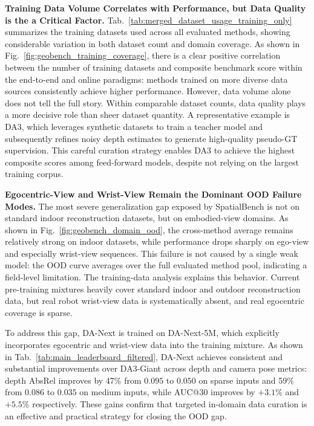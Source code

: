 \documentclass{llmxive}
\providecommand{\benchmark}{SpatialBench\xspace}
\providecommand{\dataset}{DA-Next-5M\xspace}
\providecommand{\ours}{DA-Next\xspace}
\begin{document}
\noindent\textbf{Training Data Volume Correlates with Performance, but Data Quality is the a Critical Factor.}
Tab.~\ref{tab:merged_dataset_usage_training_only} summarizes the training datasets used across all evaluated methods, showing considerable variation in both dataset count and domain coverage.
%
As shown in Fig.~\ref{fig:geobench_training_coverage}, there is a clear positive correlation between the number of training datasets and composite benchmark score within the end-to-end and online paradigms: methods trained on more diverse data sources consistently achieve higher performance.
%
However, data volume alone does not tell the full story.
%
Within comparable dataset counts, data quality plays a more decisive role than sheer dataset quantity.
%
A representative example is DA3, which leverages synthetic datasets to train a teacher model and subsequently refines noisy depth estimates to generate high-quality pseudo-GT supervision. 
%
This careful curation strategy enables DA3 to achieve the highest composite scores among feed-forward models, despite not relying on the largest training corpus.
%

\noindent\textbf{Egocentric-View and Wrist-View Remain the Dominant OOD Failure Modes.}
The most severe generalization gap exposed by \benchmark is not on standard indoor reconstruction datasets, but on embodied-view domains.
%
As shown in Fig.~\ref{fig:geobench_domain_ood}, the cross-method average remains relatively strong on indoor datasets, while performance drops sharply on ego-view and especially wrist-view sequences.
%
This failure is not caused by a single weak model: the OOD curve averages over the full evaluated method pool, indicating a field-level limitation.
%
The training-data analysis explains this behavior.
%
Current pre-training mixtures heavily cover standard indoor and outdoor reconstruction data, but real robot wrist-view data is systematically absent, and real egocentric coverage is sparse.

To address this gap, \ours is trained on \dataset, which explicitly incorporates egocentric and wrist-view data into the training mixture.
%
As shown in Tab.~\ref{tab:main_leaderboard_filtered}, \ours achieves consistent and substantial improvements over DA3-Giant across depth and camera pose metrics: depth AbsRel improves by 47\% from $0.095$ to $0.050$ on sparse inputs and 59\% from $0.086$ to $0.035$ on medium inputs, while AUC@30 improves by $+3.1\%$ and $+5.5\%$ respectively.
%
These gains confirm that targeted in-domain data curation is an effective and practical strategy for closing the OOD gap.
\end{document}
